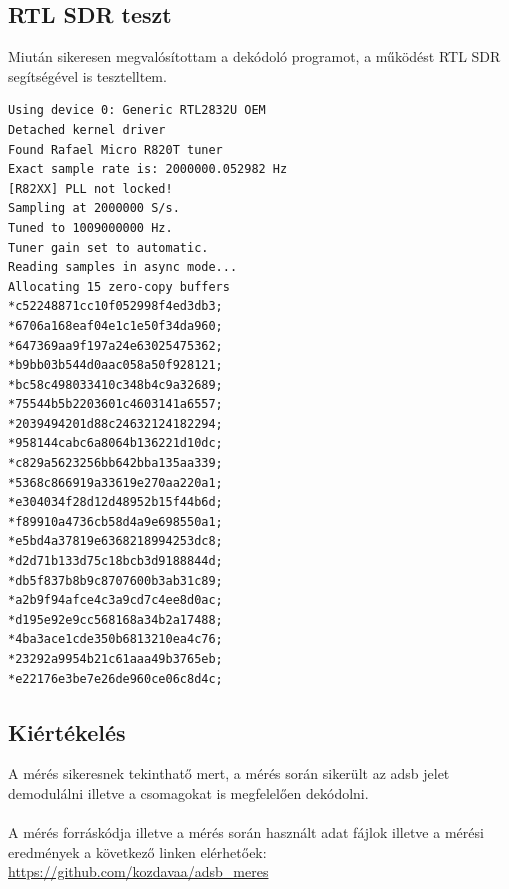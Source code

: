 \subsection{RTL SDR teszt}
Miután sikeresen megvalósítottam a dekódoló programot, a működést RTL SDR segítségével is tesztelltem.
\begin{lstlisting}
Using device 0: Generic RTL2832U OEM
Detached kernel driver
Found Rafael Micro R820T tuner
Exact sample rate is: 2000000.052982 Hz
[R82XX] PLL not locked!
Sampling at 2000000 S/s.
Tuned to 1009000000 Hz.
Tuner gain set to automatic.
Reading samples in async mode...
Allocating 15 zero-copy buffers
*c52248871cc10f052998f4ed3db3;
*6706a168eaf04e1c1e50f34da960;
*647369aa9f197a24e63025475362;
*b9bb03b544d0aac058a50f928121;
*bc58c498033410c348b4c9a32689;
*75544b5b2203601c4603141a6557;
*2039494201d88c24632124182294;
*958144cabc6a8064b136221d10dc;
*c829a5623256bb642bba135aa339;
*5368c866919a33619e270aa220a1;
*e304034f28d12d48952b15f44b6d;
*f89910a4736cb58d4a9e698550a1;
*e5bd4a37819e6368218994253dc8;
*d2d71b133d75c18bcb3d9188844d;
*db5f837b8b9c8707600b3ab31c89;
*a2b9f94afce4c3a9cd7c4ee8d0ac;
*d195e92e9cc568168a34b2a17488;
*4ba3ace1cde350b6813210ea4c76;
*23292a9954b21c61aaa49b3765eb;
*e22176e3be7e26de960ce06c8d4c;
\end{lstlisting}

\subsection{Kiértékelés}
A mérés sikeresnek tekinthatő mert, a mérés során sikerült az adsb jelet demodulálni illetve a csomagokat is megfelelően dekódolni.\\
\\
A mérés forráskódja illetve a mérés során használt adat fájlok illetve a mérési eredmények a következő linken elérhetőek: \url{https://github.com/kozdavaa/adsb_meres}
